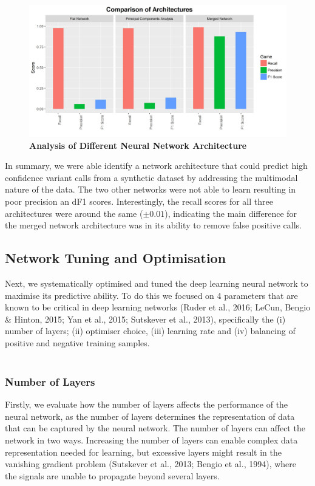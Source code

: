 \documentclass{article}
\begin{document}
\begin{figure}[H]
\includegraphics[width=\textwidth]{neuralnetworkstructureresults.jpg}
\centering
\caption{\textbf{Analysis of Different Neural Network Architecture}}
\end{figure}

In summary, we were able identify a network architecture that could predict high confidence variant calls from a synthetic dataset by addressing the multimodal nature of the data. The two other networks were not able to learn resulting in poor precision an dF1 scores. Interestingly, the recall scores for all three architectures were around the same ($\pm 0.01$), indicating the main difference for the merged network architecture was in its ability to remove false positive calls.

\subsection{Network Tuning and Optimisation}
Next, we systematically optimised and tuned the deep learning neural network to maximise its predictive ability. To do this we focused on 4 parameters that are known to be critical in deep learning networks (Ruder et al., 2016; LeCun, Bengio \& Hinton, 2015; Yan et al., 2015;  Sutskever et al., 2013), specifically the (i) number of layers; (ii) optimiser choice, (iii) learning rate and (iv) balancing of positive and negative training samples.\\\\
\subsubsection{Number of Layers}
Firstly, we evaluate how the number of layers affects the performance of the neural network, as the number of layers  determines the representation of data that can be captured by the neural network. The number of layers can affect the network in two ways. Increasing the number of layers can enable complex data representation needed for learning, but excessive layers might result in the vanishing gradient problem (Sutskever et al., 2013; Bengio et al., 1994), where the signals are unable to propagate beyond several layers.
\end{document}
